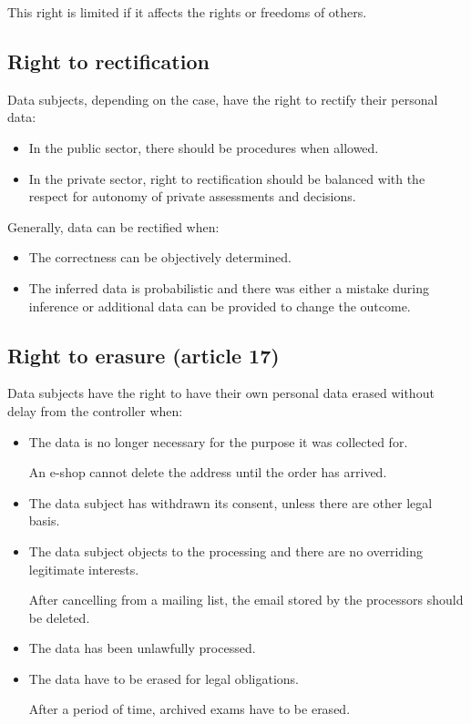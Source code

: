 This right is limited if it affects the rights or freedoms of others.


\subsection{Right to rectification} 

Data subjects, depending on the case, have the right to rectify their personal data:
\begin{itemize}
    \item In the public sector, there should be procedures when allowed.
    \item In the private sector, right to rectification should be balanced with the respect for autonomy of private assessments and decisions.
\end{itemize}

Generally, data can be rectified when:
\begin{itemize}
    \item The correctness can be objectively determined.
    \item The inferred data is probabilistic and there was either a mistake during inference or additional data can be provided to change the outcome. 
\end{itemize}


\subsection{Right to erasure (article 17)} 

Data subjects have the right to have their own personal data erased without delay from the controller when:
\begin{itemize}
    \item The data is no longer necessary for the purpose it was collected for.
    \begin{example}
        An e-shop cannot delete the address until the order has arrived.
    \end{example}

    \item The data subject has withdrawn its consent, unless there are other legal basis.
    
    \item The data subject objects to the processing and there are no overriding legitimate interests.
    \begin{example}
        After cancelling from a mailing list, the email stored by the processors should be deleted.
    \end{example}

    \item The data has been unlawfully processed.
    
    \item The data have to be erased for legal obligations.
    \begin{example}
        After a period of time, archived exams have to be erased.
    \end{example}
\end{itemize}

